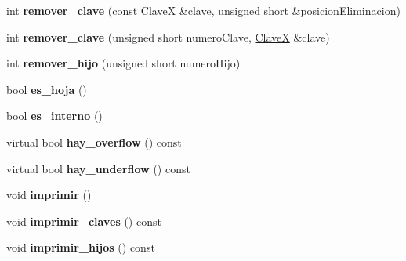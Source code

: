 \begin{DoxyCompactItemize}
\item 
\hypertarget{class_nodo_interno_a6fa4495ca63251e675e44604cf2583aa}{int {\bfseries remover\-\_\-clave} (const \hyperlink{class_clave_x}{\-Clave\-X} \&clave, unsigned short \&posicion\-Eliminacion)}\label{class_nodo_interno_a6fa4495ca63251e675e44604cf2583aa}

\item 
\hypertarget{class_nodo_interno_aaa988e6edd62e1b4290d87a8798326c3}{int {\bfseries remover\-\_\-clave} (unsigned short numero\-Clave, \hyperlink{class_clave_x}{\-Clave\-X} \&clave)}\label{class_nodo_interno_aaa988e6edd62e1b4290d87a8798326c3}

\item 
\hypertarget{class_nodo_interno_a7cb3e1aa5be818aad4749a2e29c9219b}{int {\bfseries remover\-\_\-hijo} (unsigned short numero\-Hijo)}\label{class_nodo_interno_a7cb3e1aa5be818aad4749a2e29c9219b}

\item 
\hypertarget{class_nodo_interno_a639bb283d8c3ec15007b8957e2b938d0}{bool {\bfseries es\-\_\-hoja} ()}\label{class_nodo_interno_a639bb283d8c3ec15007b8957e2b938d0}

\item 
\hypertarget{class_nodo_interno_a0d0417cafb93dc061ba5e3435ec74cdb}{bool {\bfseries es\-\_\-interno} ()}\label{class_nodo_interno_a0d0417cafb93dc061ba5e3435ec74cdb}

\item 
\hypertarget{class_nodo_interno_a77e5e302e00ca8c624b0930e1e63924a}{virtual bool {\bfseries hay\-\_\-overflow} () const }\label{class_nodo_interno_a77e5e302e00ca8c624b0930e1e63924a}

\item 
\hypertarget{class_nodo_interno_ada2cea28133f24104f10f28f73f4cd07}{virtual bool {\bfseries hay\-\_\-underflow} () const }\label{class_nodo_interno_ada2cea28133f24104f10f28f73f4cd07}

\item 
\hypertarget{class_nodo_interno_a87733b3cb1e7a4375fa2757eb01cae6c}{void {\bfseries imprimir} ()}\label{class_nodo_interno_a87733b3cb1e7a4375fa2757eb01cae6c}

\item 
\hypertarget{class_nodo_interno_a598f2ed4b7596fd566b7c536e1bd4b65}{void {\bfseries imprimir\-\_\-claves} () const }\label{class_nodo_interno_a598f2ed4b7596fd566b7c536e1bd4b65}

\item 
\hypertarget{class_nodo_interno_a95d937ea71a54a22626de2f519ef1af8}{void {\bfseries imprimir\-\_\-hijos} () const }\label{class_nodo_interno_a95d937ea71a54a22626de2f519ef1af8}


\end{DoxyCompactItemize}
